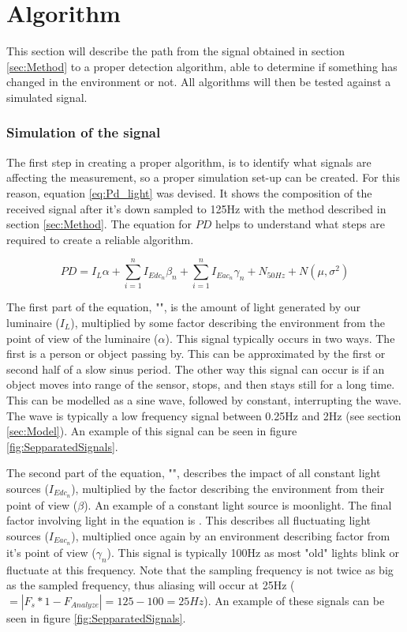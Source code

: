 \chapter{Algorithm}
\label{sec:Algorithm}
This section will describe the path from the signal obtained in section \ref{sec:Method} to a proper detection algorithm, able to determine if something has changed in the environment or not. All algorithms will then be tested against a simulated signal.

\subsection{Simulation of the signal}
The first step in creating a proper algorithm, is to identify what signals are affecting the measurement, so a proper simulation set-up can be created. For this reason, equation \ref{eq:Pd_light} was devised. It shows the composition of the received signal  after it's down sampled to 125Hz with the method described in section \ref{sec:Method}. The equation for $PD$ helps to understand what steps are required to create a reliable algorithm.

\begin{equation}
\label{eq:Pd_light}
PD = I_{L} \alpha + \sum_{i=1}^n I_{Edc_{n}} \beta_{n} + \sum_{i=1}^n I_{Eac{_n}} \gamma_{n} + N_{50Hz} + N(\mu,\sigma^2)
\end{equation}

The first part of the equation, "", is the amount of light generated by our luminaire ($I_{L}$), multiplied by some factor describing the environment from the point of view of the luminaire ($\alpha$). This signal typically occurs in two ways. The first is a person or object passing by. This can be approximated by the first or second half of a slow sinus period. The other way this signal can occur is if an object moves into range of the sensor, stops, and then stays still for a long time. This can be modelled as a sine wave, followed by constant, interrupting the wave. The wave is typically a low frequency signal between 0.25Hz and 2Hz (see section \ref{sec:Model}). An example of this signal can be seen in figure \ref{fig:SepparatedSignals}.

The second part of the equation, "", describes the impact of all constant light sources ($I_{Edc_{n}}$), multiplied by the factor describing the environment from their point of view ($\beta$). An example of a constant light source is moonlight. The final factor involving light in the equation is . This describes all fluctuating light sources ($I_{Eac_{n}}$), multiplied once again by an environment describing factor from it's point of view ($\gamma_{n}$). This signal is typically 100Hz as most "old" lights blink or fluctuate at this frequency. Note that the sampling frequency is not twice as big as the sampled frequency, thus aliasing will occur at 25Hz ($= |F_{s} * 1 - F_{Analyze}| = 125 - 100 = 25Hz$)\cite{aliassing}. An example of these signals can be seen in figure \ref{fig:SepparatedSignals}.


